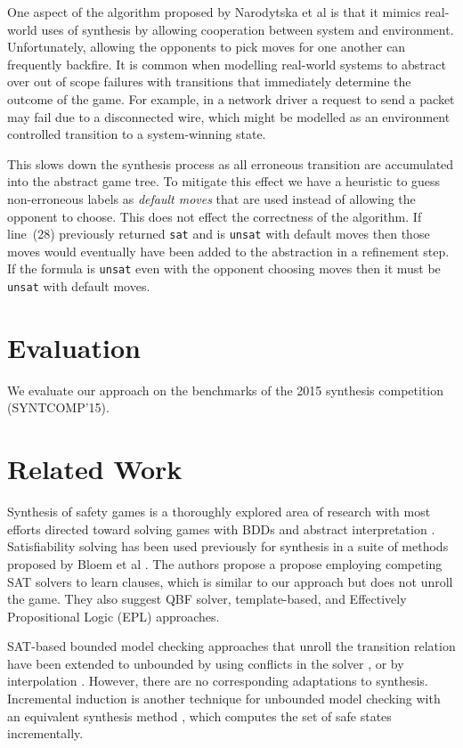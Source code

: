 \documentclass{llncs}
\begin{document}
One aspect of the algorithm proposed by Narodytska et al\cite{narodytska2014}
is that it mimics real-world uses of synthesis by allowing cooperation between
system and environment. Unfortunately, allowing the opponents to pick moves for
one another can frequently backfire. It is common when modelling real-world
systems to abstract over out of scope failures with transitions that
immediately determine the outcome of the game. For example, in a network driver
a request to send a packet may fail due to a disconnected wire, which might be
modelled as an environment controlled transition to a system-winning state.

This slows down the synthesis process as all erroneous transition are
accumulated into the abstract game tree. To mitigate this effect we have a
heuristic to guess non-erroneous labels as \emph{default moves} that are used
instead of allowing the opponent to choose. This does not effect the
correctness of the algorithm. If line~(28) previously returned \texttt{sat} and
is \texttt{unsat} with default moves then those moves would eventually have
been added to the abstraction in a refinement step. If the formula is
\texttt{unsat} even with the opponent choosing moves then it must be
\texttt{unsat} with default moves.

\section{Evaluation}

We evaluate our approach on the benchmarks of the 2015 synthesis competition
(SYNTCOMP'15). 

\section{Related Work}

Synthesis of safety games is a thoroughly explored area of research with most
efforts directed toward solving games with BDDs \cite{burch1990} and abstract
interpretation \cite{walker2014,brenguier2014}. Satisfiability solving has been used
previously for synthesis in a suite of methods proposed by Bloem et al
\cite{bloem2014}. The authors propose a propose employing competing SAT solvers
to learn clauses, which is similar to our approach but does not unroll the
game. They also suggest QBF solver, template-based, and Effectively
Propositional Logic (EPL) approaches.

SAT-based bounded model checking approaches that unroll the transition relation
have been extended to unbounded by using conflicts in the solver
\cite{mcmillan2002}, or by interpolation \cite{mcmillan2003}. However, there
are no corresponding adaptations to synthesis. Incremental induction
\cite{bradley2011} is another technique for unbounded model checking with an
equivalent synthesis method \cite{morgenstern2013}, which computes the set of
safe states incrementally.
\end{document}
